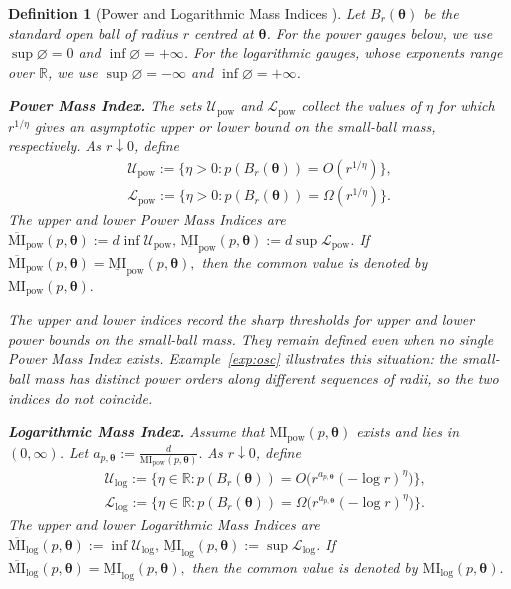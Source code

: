 \documentclass[11pt,a4paper]{article}
\newcommand{\R}{\mathbb{R}}
\newcommand{\MI}{\mathrm{MI}}
\newcommand{\pa}{\boldsymbol\theta}
\theoremstyle{compactplain}
\theoremstyle{compactdefinition}
\newtheorem{definition}[theorem]{Definition}
\numberwithin{equation}{section}
\begin{document}
\begin{definition}[Power and Logarithmic Mass Indices ]\label{define:MI}
Let \(B_r(\pa)\) be the standard open ball of radius \(r\) centred at \(\pa\). For the power gauges below, we use \(\sup\varnothing=0\) and \(\inf\varnothing=+\infty\). For the logarithmic gauges, whose exponents range over \(\R\), we use \(\sup\varnothing=-\infty\) and \(\inf\varnothing=+\infty\).


\textbf{Power Mass Index.}
The sets \(\mathcal U_{\mathrm{pow}}\) and
\(\mathcal L_{\mathrm{pow}}\) collect the values of \(\eta\)
for which \(r^{1/\eta}\) gives an asymptotic upper or lower
bound on the small-ball mass, respectively.
As \(r\downarrow0\), define
\[
\begin{aligned}
\mathcal{U}_{\mathrm{pow}}
:=
\Big\{\eta>0:
p(B_r(\pa))=O(r^{1/\eta})
\Big\},\\
\mathcal{L}_{\mathrm{pow}}
:=
\Big\{\eta>0:
p(B_r(\pa))=\Omega(r^{1/\eta})
\Big\}.
\end{aligned}
\]
The upper and lower Power Mass Indices are
\(\overline{\MI}_{\mathrm{pow}}(p,\pa) :=d\inf\mathcal{U}_{\mathrm{pow}},\, \underline{\MI}_{\mathrm{pow}}(p,\pa) :=d\sup\mathcal{L}_{\mathrm{pow}}\).
If
$
\overline{\MI}_{\mathrm{pow}}(p,\pa)
=
\underline{\MI}_{\mathrm{pow}}(p,\pa),
$
then the common value is denoted by
$
\MI_{\mathrm{pow}}(p,\pa).
$

The upper and lower indices record the sharp thresholds for upper
and lower power bounds on the small-ball mass. They remain defined
even when no single Power Mass Index exists.
Example~\ref{exp:osc} illustrates this situation: the small-ball
mass has distinct power orders along different sequences of radii,
so the two indices do not coincide.

\textbf{Logarithmic Mass Index.}
Assume that \(\MI_{\mathrm{pow}}(p,\pa)\) exists and lies in \((0,\infty)\).
Let
$
a_{p,\pa}:=\frac{d}{\MI_{\mathrm{pow}}(p,\pa)}.
$
As $r\downarrow 0$, define 
\[
\begin{aligned}
&\mathcal{U}_{\mathrm{log}}
:=
\big\{
\eta\in\R:
p(B_r(\pa))=O\bigl(r^{a_{p,\pa}}(-\log r)^\eta\bigr)
\big\},\\
&\mathcal{L}_{\mathrm{log}}
:=
\big\{
\eta\in \R:
p(B_r(\pa))=\Omega\bigl(r^{a_{p,\pa}}(-\log r)^\eta\bigr)
\big\}.
\end{aligned}
\]
The upper and lower Logarithmic Mass Indices are
\(\overline{\MI}_{\mathrm{log}}(p,\pa) := \inf\mathcal{U}_{\mathrm{log}},\, \underline{\MI}_{\mathrm{log}}(p,\pa) := \sup\mathcal{L}_{\mathrm{log}}\).
If
$
\overline{\MI}_{\mathrm{log}}(p,\pa)
=
\underline{\MI}_{\mathrm{log}}(p,\pa),
$
then the common value is denoted by
$
\MI_{\mathrm{log}}(p,\pa).
$
\end{definition}
\end{document}
